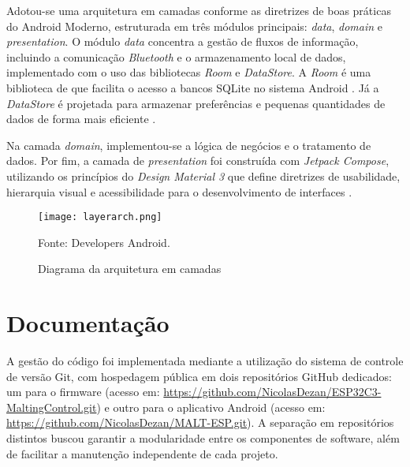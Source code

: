 Adotou-se uma arquitetura em camadas conforme as diretrizes de boas práticas do Android Moderno, estruturada em três módulos principais: \textit{data}, \textit{domain} e \textit{presentation}. O módulo \textit{data} concentra a gestão de fluxos de informação, incluindo a comunicação \textit{Bluetooth} e o armazenamento local de dados, implementado com o uso das bibliotecas \textit{Room} e \textit{DataStore}. A \textit{Room} é uma biblioteca de que facilita o acesso a bancos SQLite no sistema Android \cite{android_room}. Já a \textit{DataStore} é projetada para armazenar preferências e pequenas quantidades de dados de forma mais eficiente \cite{android_datastore}.

Na camada \textit{domain}, implementou-se a lógica de negócios e o tratamento de dados. Por fim, a camada de \textit{presentation} foi construída com \textit{Jetpack Compose}, utilizando os princípios do \textit{Design Material 3} que define diretrizes de usabilidade, hierarquia visual e acessibilidade para o desenvolvimento de interfaces \cite{material3}.

\begin{figure}[ht]
    \centering
    \caption{Diagrama da arquitetura em camadas}
    \label{fig:layerarch}
    \texttt{[image: layerarch.png]}

    {\centering\footnotesize Fonte: Developers Android.\par}
\end{figure}

\section{Documentação}
A gestão do código foi implementada mediante a utilização do sistema de controle de versão Git, com hospedagem pública em dois repositórios GitHub dedicados: um para o firmware (acesso em: \url{https://github.com/NicolasDezan/ESP32C3-MaltingControl.git}) e outro para o aplicativo Android (acesso em: \url{https://github.com/NicolasDezan/MALT-ESP.git}). A separação em repositórios distintos buscou garantir a modularidade entre os componentes de software, além de facilitar a manutenção independente de cada projeto.

